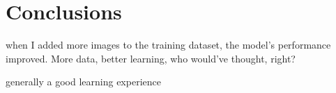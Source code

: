 \chapter{Conclusions}
when I added more images to the training dataset, the model's performance improved. More data, better learning, who would've thought, right?

generally a good learning experience